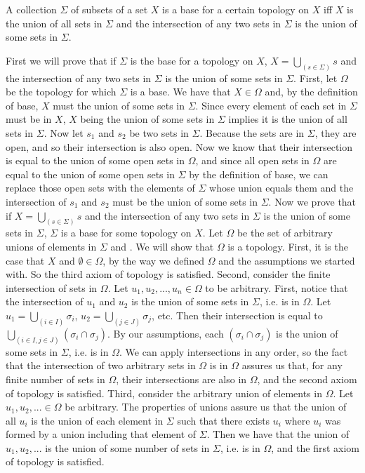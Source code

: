 \begin{majorEx}%
A collection $\Sigma$ of subsets of a set $X$ is a base for a certain topology on $X$ iff $X$ is the union of all sets in $\Sigma$ and
the intersection of any two sets in $\Sigma$ is the union of some sets in $\Sigma$.
\end{majorEx}
First we will prove that if $\Sigma$ is the base for a topology on $X$, $X = \bigcup_(s \in \Sigma) s$ and the intersection of any two sets in $\Sigma$ is the union of some sets in $\Sigma$. First, let $\Omega$ be the topology for which $\Sigma$ is a base. We have that $X \in \Omega$ and, by the definition of base, $X$ must the union of some sets in $\Sigma$. Since every element of each set in $\Sigma$ must be in $X$, $X$ being the union of some sets in $\Sigma$ implies it is the union of all sets in $\Sigma$. Now let $s_1$ and $s_2$ be two sets in $\Sigma$. Because the sets are in $\Sigma$, they are open, and so their intersection is also open. Now we know that their intersection is equal to the union of some open sets in $\Omega$, and since all open sets in $\Omega$ are equal to the union of some open sets in $\Sigma$ by the definition of base, we can replace those open sets with the elements of $\Sigma$ whose union equals them and the intersection of $s_1$ and $s_2$ must be the union of some sets in $\Sigma$.
Now we prove that if $X = \bigcup_(s \in \Sigma) s$ and the intersection of any two sets in $\Sigma$ is the union of some sets in $\Sigma$, $\Sigma$ is a base for some topology on $X$. Let $\Omega$ be the set of arbitrary unions of elements in $\Sigma$ and \emptyset. We will show that $\Omega$ is a topology.
First, it is the case that $X$ and $\emptyset \in \Omega$, by the way we defined $\Omega$ and the assumptions we started with. So the third axiom of topology is satisfied.
Second, consider the finite intersection of sets in $\Omega$. Let $u_1, u_2, ..., u_n \in \Omega$ to be arbitrary. First, notice that the intersection of $u_1$ and $u_2$ is the union of some sets in $\Sigma$, i.e. is in $\Omega$. Let $u_1 = \bigcup_(i \in I) \sigma_i$, $u_2= \bigcup_(j \in J) \sigma_j$, etc. Then their intersection is equal to $\bigcup_(i \in I, j \in J) (\sigma_i \cap \sigma_j)$. By our assumptions, each $(\sigma_i \cap \sigma_j)$ is the union of some sets in $\Sigma$, i.e. is in $\Omega$. We can apply intersections in any order, so the fact that the intersection of two arbitrary sets in $\Omega$ is in $\Omega$ assures us that, for any finite number of sets in $\Omega$, their intersections are also in $\Omega$, and the second axiom of topology is satisfied.
Third, consider the arbitrary union of elements in $\Omega$. Let $u_1, u_2, ... \in \Omega$ be arbitrary. The properties of unions assure us that the union of all $u_i$ is the union of each element in $\Sigma$ such that there exists $u_i$ where $u_i$ was formed by a union including that element of $\Sigma$. Then we have that the union of $u_1, u_2, ...$ is the union of some number of sets in $\Sigma$, i.e. is in $\Omega$, and the first axiom of topology is satisfied.
